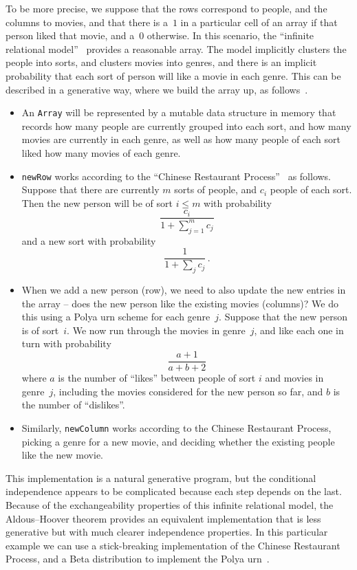 \documentclass[AHL,Unicode,longabstracts,published]{cedram}
\begin{document}
To be more precise, we suppose that the rows correspond to people, and the columns to movies, and that there is a~$1$ in a particular cell of an array if that person liked that movie, and a~$0$ otherwise. In this scenario, the ``infinite relational model''~\cite{IRM,OrbanzRoy,IHRM} provides a reasonable array. The model implicitly clusters the people into sorts, and clusters movies into genres, and there is an implicit probability that each sort of person will like a movie in each genre. This can be described in a generative way, where we build the array up, as follows~\cite[Example~IV.1]{OrbanzRoy}.
\begin{itemize}
\item An \texttt{Array} will be represented by a mutable data structure in memory that records how many people are currently grouped into each sort, and how many movies are currently in each genre, as well as how many people of each sort liked how many movies of each genre.
\item \texttt{newRow} works according to the ``Chinese Restaurant Process''~\cite{ghosal2017fundamentals} as follows. Suppose that there are currently $m$ sorts of people, and $c_i$ people of each sort. Then the new person will be of sort $i\leq m$ with probability
\[
\frac{c_i}{1+\displaystyle\sum_{j=1}^mc_j}
\]
and a new sort with probability
\[
\frac{1}{1+\displaystyle\sum_jc_j}\,.
\]
\item When we add a new person (row), we need to also update the new entries in the array -- does the new person like the existing movies (columns)? We do this using a Polya urn scheme for each genre~$j$. Suppose that the new person is of sort~$i$. We now run through the movies in genre~$j$, and like each one in turn with probability
\[
\frac{a+1}{a+b+2}
\]
where $a$ is the number of ``likes'' between people of sort $i$ and movies in genre~$j$, including the movies considered for the new person so far, and $b$ is the number of ``dislikes''.
\item Similarly, \texttt{newColumn} works according to the Chinese Restaurant Process, picking a genre for a new movie, and deciding whether the existing people like the new movie.
\end{itemize}
This implementation is a natural generative program, but the conditional independence appears to be complicated because each step depends on the last. Because of the exchangeability properties of this infinite relational model, the Aldous--Hoover theorem provides an equivalent implementation that is less generative but with much clearer independence properties. In this particular example we can use a stick-breaking implementation of the Chinese Restaurant Process, and a Beta distribution to implement the Polya urn~\cite[Example~IV.6]{OrbanzRoy}.
\end{document}
